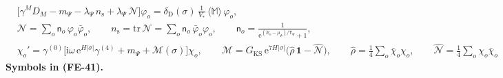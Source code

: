\documentclass[
  10pt,
]{article}
\begin{document}
\[
\begin{aligned}
&\big[\gamma^MD_M - m_\Psi - \lambda_\Psi\,n_{\mathrm{s}} + \lambda_\Psi\,\mathcal{N}\big]\varphi_o
 = \delta_{\mathrm{D}}(\sigma)\,\frac{1}{V_*}\,\langle\mathbb{M}\rangle\,\varphi_o,\\
&\mathcal{N} = \sum_o\mathsf{n}_o\,\varphi_o\bar\varphi_o,\qquad n_{\mathrm{s}} = \mathrm{tr}\,\mathcal{N} = \sum_o\mathsf{n}_o\,\bar\varphi_o\varphi_o,\qquad
 \mathsf{n}_o = \frac{1}{\mathrm{e}^{(E_o - \mu_\Psi)/\mathsf{T}_\Psi} + 1},\\
&\chi_o' = \gamma^{(0)}\Big[\mathrm{i}\omega\,\mathrm{e}^{H\lvert\sigma\rvert}\gamma^{(4)} + m_\Psi + \mathcal{M}(\sigma)\Big]\chi_o,\qquad
 \mathcal{M} = G_{\mathrm{KS}}\,\mathrm{e}^{7H\lvert\sigma\rvert}\big(\hat\rho\,\mathbf{1} - \hat{\mathcal{N}}\big),\qquad
 \hat\rho = \frac14\sum_o\bar\chi_o\chi_o,\qquad \hat{\mathcal{N}} = \frac14\sum_o\chi_o\bar\chi_o
\end{aligned} \tag{FE-41}
\] \textbf{Symbols in (FE-41).}
\end{document}
